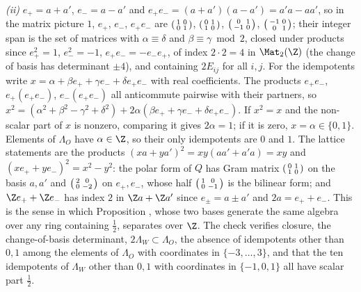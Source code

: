 \emph{(ii)} $e_{+} = a + a'$, $e_{-} = a - a'$ and $e_{+}e_{-} = (a + a')(a - a') = a'a - aa'$, so in the matrix picture $1$, $e_{+}$, $e_{-}$, $e_{+}e_{-}$ are $\begin{psmallmatrix} 1 & 0 \\ 0 & 1 \end{psmallmatrix}$, $\begin{psmallmatrix} 0 & 1 \\ 1 & 0 \end{psmallmatrix}$, $\begin{psmallmatrix} 0 & 1 \\ -1 & 0 \end{psmallmatrix}$, $\begin{psmallmatrix} -1 & 0 \\ 0 & 1 \end{psmallmatrix}$; their integer span is the set of matrices with $\alpha \equiv \delta$ and $\beta \equiv \gamma \bmod 2$, closed under products since $e_{+}^{2} = 1$, $e_{-}^{2} = -1$, $e_{+}e_{-} = -e_{-}e_{+}$, of index $2 \cdot 2 = 4$ in $\Mat_{2}(\Z)$ (the change of basis has determinant $\pm 4$), and containing $2E_{ij}$ for all $i, j$. For the idempotents write $x = \alpha + \beta e_{+} + \gamma e_{-} + \delta e_{+}e_{-}$ with real coefficients. The products $e_{+}e_{-}$, $e_{+}(e_{+}e_{-})$, $e_{-}(e_{+}e_{-})$ all anticommute pairwise with their partners, so $x^{2} = (\alpha^{2} + \beta^{2} - \gamma^{2} + \delta^{2}) + 2\alpha(\beta e_{+} + \gamma e_{-} + \delta e_{+}e_{-})$. If $x^{2} = x$ and the non-scalar part of $x$ is nonzero, comparing it gives $2\alpha = 1$; if it is zero, $x = \alpha \in \{0, 1\}$. Elements of $\Lambda_{O}$ have $\alpha \in \Z$, so their only idempotents are $0$ and $1$. The lattice statements are the products $(xa + ya')^{2} = xy(aa' + a'a) = xy$ and $(xe_{+} + ye_{-})^{2} = x^{2} - y^{2}$: the polar form of $Q$ has Gram matrix $\begin{psmallmatrix} 0 & 1 \\ 1 & 0 \end{psmallmatrix}$ on the basis $a, a'$ and $\begin{psmallmatrix} 2 & 0 \\ 0 & -2 \end{psmallmatrix}$ on $e_{+}, e_{-}$, whose half $\begin{psmallmatrix} 1 & 0 \\ 0 & -1 \end{psmallmatrix}$ is the bilinear form; and $\Z e_{+} + \Z e_{-}$ has index $2$ in $\Z a + \Z a'$ since $e_{\pm} = a \pm a'$ and $2a = e_{+} + e_{-}$. This is the sense in which Proposition , whose two bases generate the same algebra over any ring containing $\tfrac12$, separates over $\Z$. The check verifies closure, the change-of-basis determinant, $2\Lambda_{W} \subset \Lambda_{O}$, the absence of idempotents other than $0, 1$ among the elements of $\Lambda_{O}$ with coordinates in $\{-3, \dots, 3\}$, and that the ten idempotents of $\Lambda_{W}$ other than $0, 1$ with coordinates in $\{-1, 0, 1\}$ all have scalar part $\tfrac12$.

